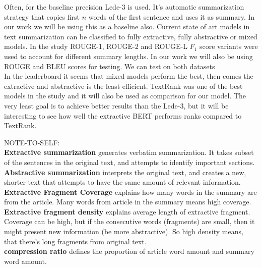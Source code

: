 \documentclass{article}
\begin{document}
Often, for the baseline precision Lede-3 is used. It's automatic summarization strategy that copies first $n$ words of the first sentence and uses it as summary. In our work we will be using this as a baseline also. Current state of art models in text summarization can be classified to fully extractive, fully abstractive or mixed models. In the study \cite{dataset} ROUGE-1, ROUGE-2 and ROUGE-L $F_1$ score variants were used to account for different summary lengths. In our work we will also be using ROUGE and BLEU scores for testing. We can test on both datasets \cite{dataset} \cite{ny_dataset}\\

\noindent
In the leaderboard it seems that mixed models perform the best, then comes the extractive and abstractive is the least efficient. TextRank was one of the best models in the study \cite{dataset} and it will also be used as comparison for our model.
The very least goal is to achieve better results than the Lede-3, but it will be interesting to see how well the extractive BERT performs ranks compared to TextRank. 


	
	
\noindent
NOTE-TO-SELF: \\
\textbf{Extractive summarization} generates verbatim summarization. It takes subset of the sentences in the original text, and attempts to identify important sections. \cite{dataset}\\
\textbf{Abstractive summarization} interprets the original text, and creates a new, shorter text that attempts to have the same amount of relevant information.\\
\textbf{Extractive Fragment Coverage} explains how many words in the summary are from the article. Many words from article in the summary means high coverage.\\
\textbf{Extractive fragment density} explains average length of extractive fragment. Coverage can be high, but if the consecutive words (fragments) are small, then it might present new information (be more abstractive). So high density means, that there's long fragments from original text.\\
\textbf{compression ratio} defines the proportion of article word amount and summary word amount. \\
\end{document}
